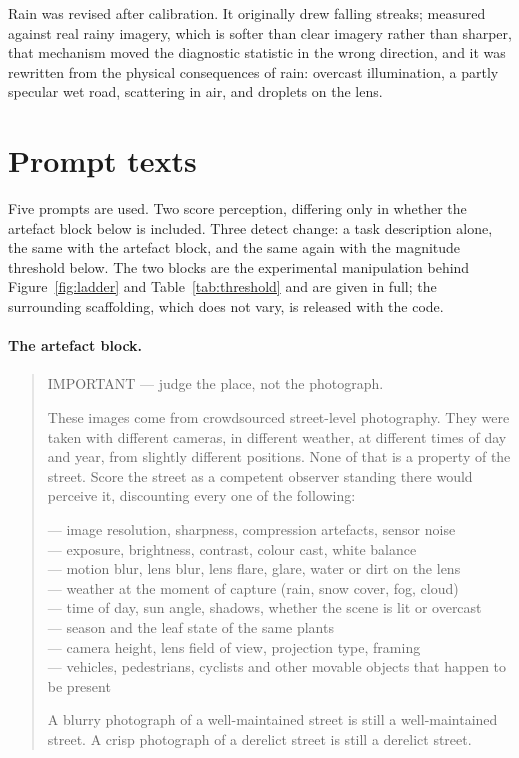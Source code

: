 Rain was revised after calibration. It originally drew falling streaks; measured
against real rainy imagery, which is softer than clear imagery rather than
sharper, that mechanism moved the diagnostic statistic in the wrong direction,
and it was rewritten from the physical consequences of rain: overcast
illumination, a partly specular wet road, scattering in air, and droplets on the
lens.

\section{Prompt texts}

Five prompts are used. Two score perception, differing only in whether the
artefact block below is included. Three detect change: a task description alone,
the same with the artefact block, and the same again with the magnitude
threshold below. The two blocks are the experimental manipulation behind
Figure~\ref{fig:ladder} and Table~\ref{tab:threshold} and are given in full;
the surrounding scaffolding, which does not vary, is released with the code.

\paragraph{The artefact block.}
\begin{quote}\small\ttfamily
IMPORTANT --- judge the place, not the photograph.

These images come from crowdsourced street-level photography. They were taken
with different cameras, in different weather, at different times of day and
year, from slightly different positions. None of that is a property of the
street. Score the street as a competent observer standing there would perceive
it, discounting every one of the following:

--- image resolution, sharpness, compression artefacts, sensor noise \\
--- exposure, brightness, contrast, colour cast, white balance \\
--- motion blur, lens blur, lens flare, glare, water or dirt on the lens \\
--- weather at the moment of capture (rain, snow cover, fog, cloud) \\
--- time of day, sun angle, shadows, whether the scene is lit or overcast \\
--- season and the leaf state of the same plants \\
--- camera height, lens field of view, projection type, framing \\
--- vehicles, pedestrians, cyclists and other movable objects that happen to be
present

A blurry photograph of a well-maintained street is still a well-maintained
street. A crisp photograph of a derelict street is still a derelict street.
\end{quote}


